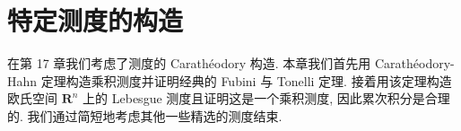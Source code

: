 \documentclass[../main.tex]{subfiles}
\begin{document}
\chapter{特定测度的构造}\label{chapter:ch20-特定测度的构造}

在第 17 章我们考虑了测度的 Carath\'eodory 构造. 本章我们首先用 Carath\'eodory-Hahn 定理构造乘积测度并证明经典的 Fubini 与 Tonelli 定理. 接着用该定理构造欧氏空间 $\mathbf{R}^{n}$ 上的 Lebesgue 测度且证明这是一个乘积测度, 因此累次积分是合理的. 我们通过简短地考虑其他一些精选的测度结束.





\end{document}
